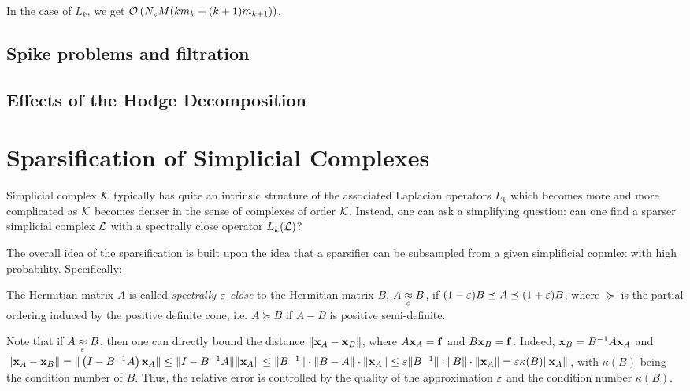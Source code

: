 \documentclass{mynotes}
\begin{document}
In the case of \( L_k \), we get \( \mathcal{O} \left( N_z M ( k m_k + (k+1)m_{k+1}) \right)\).

\section{ Spike problems and filtration }

\section{ Effects of the Hodge Decomposition }

\chapter{ Sparsification of Simplicial Complexes }

Simplicial complex \( \mathcal{K} \) typically has quite an intrinsic structure of the associated Laplacian operators \( L_k \) which becomes more and more complicated as \( \mathcal{K} \) becomes denser in the sense of complexes of order \( \mathcal{K} \). Instead, one can ask a simplifying question: can one find a sparser simplicial complex \( \mathcal{L} \) with a spectrally close operator \( L_k (\mathcal{L} )\)?

The overall idea of the sparsification is built upon the idea that a sparsifier can be subsampled from a given simplificial copmlex with high probability. Specifically: 
\begin{definition}
      The Hermitian matrix \( A \) is called \emph{spectrally \(\varepsilon\)-close} to the Hermitian matrix \( B \), \( A \underset{\varepsilon}{\approx} B \), if 
            $( 1 - \varepsilon ) B \preceq A \preceq ( 1 + \varepsilon ) B $,
      where \( \succeq \) is the partial ordering induced by the positive definite cone, i.e. \( A \succeq B \) if \( A - B \) is positive semi-definite.
\end{definition}

\begin{remark}\label{rem:approx_error}
      Note that if \( A \underset{\varepsilon}{\approx} B \), then one can directly bound the distance \( \| \mathbf{x}_A - \mathbf{x}_B \| \), where \( A \mathbf{x}_A = \mathbf{f} \) and \( B \mathbf{x}_B = \mathbf{f}\). Indeed, \( \mathbf{x}_B = B^{-1} A \mathbf{x}_A \) and \(\| \mathbf{x}_A - \mathbf{x}_B \| = \| \left( I - B^{-1}A \right) \mathbf{x}_A \| \le \| I - B^{-1}A \| \| \mathbf{x}_A \| \le  \| B^{-1} \| \cdot \| B - A \| \cdot \| \mathbf{x}_A \| \le \varepsilon \| B^{-1} \| \cdot \| B \| \cdot \| \mathbf{x}_A \| = \varepsilon \kappa(B) \| \mathbf{x}_A \| \), with \( \kappa(B) \) being the condition number of \( B \). Thus, the relative error is controlled by the quality of the approximation \( \varepsilon \) and the condition number \( \kappa(B )\). %
\end{remark}
\end{document}
